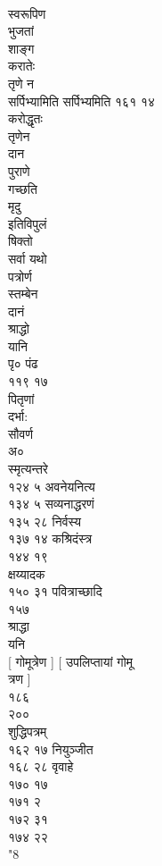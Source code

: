 \documentclass[11pt, openany]{book}
\begin{document}
{{{{{{{{{{{{{{{{{{{{{{{{{{{{{{{{{{{{{{{{{{{{{{{{{{{{{{{{{{{{{{{{{{{{{{{{{{{{{{{{{{{{{{{{{{{{{{{{{{{{{{{{{{{{{{{{{{{{{{{{{{{{{{{{{{{{{{{{{{{{{{{{{{{{{{{{{{{{{{{{{{{{{{{{{{\\
स्वरूपिण\\
भुजतां\\
शाङ्ग\\
करातेः\\
तृणे }{न}{\\
सर्पिभ्यामिति सर्पिभ्यमिति १६१ १४\\
करोद्धृतः\\
तृणेन\\
दान\\
पुराणे\\
गच्छति\\
मृदु\\
इतिविपुलं\\
षिक्तो\\
सर्वा यथो\\
पत्रोर्ण\\
स्तम्बेन\\
दानं\\
श्राद्धो\\
यानि\\
पृ० पंढ\\
११९ १७\\
पितृणां\\
दर्भा:\\
सौवर्ण\\
अ०\\
स्मृत्यन्तरे\\
१२४ ५ अवनेयनित्य\\
१३४ ५ सव्यनाद्धरणं\\
१३५ २८ निर्वस्य\\
१३७ १४ कश्रिदंस्त्र\\
१४४ १९\\
क्षय्यादक\\
१५० ३१ \textbar{} पवित्राच्छादि\\
१५७\\
श्राद्धा\\
यनि\\
{[} गोमूत्रेण {]} {[} उपलिप्तायां गोमू\\
त्रण {]}\\
१८६\\
२००\\
शुद्धिपत्रम् \textbar{}\\
१६२ १७ नियुञ्जीत\\
१६८ २८ वृवाहे\\
१७० १७\\
१७१ २\\
१७२ ३१\\
१७४ २२\\
"8\\
}}}}}}}}}}}}}}}}}}}}}}}}}}}}}}}}}}}}}}}}}}}}}}}}}}}}}}}}}}}}}}}}}}}}}}}}}}}}}}}}}}}}}}}}}}}}}}}}}}}}}}}}}}}}}}}}}}}}}}}}}}}}}}}}}}}}}}}}}}}}}}}}}}}}}}}}}}}}}}}}}}}}}}}}}}
\end{document}
